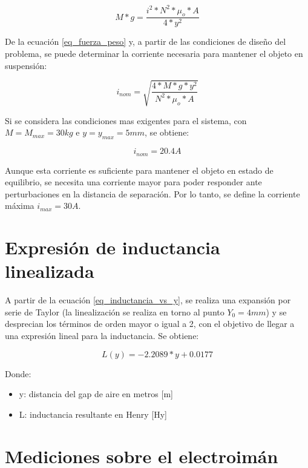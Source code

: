 \begin{equation}\label{eq_fuerza_peso}
	M*g=\frac{i^{2}*N^{2}*\mu_{o}*A}{4*y^{2}}
\end{equation}

\noindent De la ecuación \ref{eq_fuerza_peso} y, a partir de las condiciones de diseño del problema, se puede determinar la corriente necesaria para mantener el objeto en suspensión:

\begin{equation} \label{eq_corriente_peso}
	i_{nom}=\sqrt{\frac{4*M*g*y^{2}}{N^{2}*\mu_{o}*A}}
\end{equation}

Si se considera las condiciones mas exigentes para el sistema, con $M=M_{max}=30kg$ e $y=y_{max}=5mm$, se obtiene:

\begin{equation}
	i_{nom}=20.4A
\end{equation}

\noindent Aunque esta corriente es suficiente para mantener el objeto en estado de equilibrio, se necesita una corriente mayor para poder responder ante perturbaciones en la distancia de separación. Por lo tanto, se define la corriente máxima $i_{max}=30A$.



\section{Expresión de inductancia linealizada}

\noindent A partir de la ecuación \ref{eq_inductancia_vs_y}, se realiza una expansión por serie de Taylor (la linealización se realiza en torno al punto $Y_{0}=4mm$) y se desprecian los términos de orden mayor o igual a 2, con el objetivo de llegar a una expresión lineal para la inductancia. Se obtiene:


\begin{equation} \label{eq_inductancia_lineal_teorica}
	L(y)=-2.2089*y+0.0177
\end{equation}

\noindent Donde:
\begin{itemize}
	\item y: distancia del gap de aire en metros [m]
	\item L: inductancia resultante en Henry [Hy]
\end{itemize}

\section{Mediciones sobre el electroimán}

